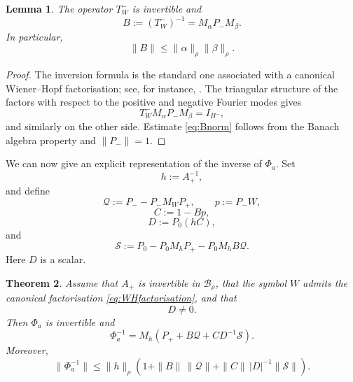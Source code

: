 \documentclass[11pt,a4paper]{amsart}
\newtheorem{theorem}{Theorem}[section]
\newtheorem{lemma}[theorem]{Lemma}
\begin{document}
\begin{lemma}\label{lem:ToeplitzInverse}
	The operator $T_W^-$ is invertible and
	\begin{equation}\label{eq:Boperator}
		B:=(T_W^-)^{-1}
		=
		M_\alpha P_-M_\beta.
	\end{equation}
	In particular,
	\begin{equation}\label{eq:Bnorm}
		\|B\|
		\le
		\|\alpha\|_\rho\|\beta\|_\rho.
	\end{equation}
\end{lemma}

\begin{proof}
	The inversion formula is the standard one associated with a canonical
	Wiener--Hopf factorisation; see, for instance,
	\cite{BottcherSilbermann}. The triangular structure of the factors
	with respect to the positive and negative Fourier modes gives
	\[
	T_W^-M_\alpha P_-M_\beta=I_{H^-},
	\]
	and similarly on the other side. Estimate \eqref{eq:Bnorm} follows
	from the Banach algebra property and $\|P_-\|=1$.
\end{proof}

We can now give an explicit representation of the inverse of
$\Phi_a$. Set
\[
h:=A_+^{-1},
\]
and define
\begin{equation}\label{eq:Qoperator}
	\mathcal Q
	:=
	P_--P_-M_WP_+,
	\qquad
	p:=P_-W,
\end{equation}
\begin{equation}\label{eq:CDF}
	C:=1-Bp,
\end{equation}
\begin{equation}\label{eq:Dscalar}
	D:=P_0(hC),
\end{equation}
and
\begin{equation}\label{eq:Soperator}
	\mathcal S
	:=
	P_0-P_0M_hP_+-P_0M_hB\mathcal Q.
\end{equation}
Here $D$ is a scalar.

\begin{theorem}\label{thm:PhiInverse}
	Assume that $A_+$ is invertible in $\mathcal B_\rho$, that the symbol
	$W$ admits the canonical factorisation
	\eqref{eq:WHfactorisation}, and that
	\[
	D\neq0.
	\]
	Then $\Phi_a$ is invertible and
	\begin{equation}\label{eq:explicitL}
		\Phi_a^{-1}
		=
		M_h
		\left(
		P_+
		+
		B\mathcal Q
		+
		CD^{-1}\mathcal S
		\right).
	\end{equation}
	Moreover,
	\begin{equation}\label{eq:inverse-norm}
		\|\Phi_a^{-1}\|
		\le
		\|h\|_\rho
		\left(
		1+
		\|B\|\,\|\mathcal Q\|
		+
		\|C\|\,|D|^{-1}\|\mathcal S\|
		\right).
	\end{equation}
\end{theorem}
\end{document}
